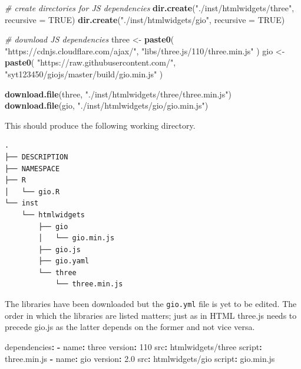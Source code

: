 \documentclass[
]{krantz}
\makeatletter
\newenvironment{Shaded}{\begin{snugshade}}{\end{snugshade}}
\newcommand{\AttributeTok}[1]{\textcolor[rgb]{0.61,0.61,0.61}{#1}}
\newcommand{\CommentTok}[1]{\textcolor[rgb]{0.37,0.37,0.37}{\textit{#1}}}
\newcommand{\DataTypeTok}[1]{\textcolor[rgb]{0.27,0.27,0.27}{#1}}
\newcommand{\DecValTok}[1]{\textcolor[rgb]{0.06,0.06,0.06}{#1}}
\newcommand{\FloatTok}[1]{\textcolor[rgb]{0.06,0.06,0.06}{#1}}
\newcommand{\FunctionTok}[1]{\textcolor[rgb]{0,0,0}{#1}}
\newcommand{\KeywordTok}[1]{\textcolor[rgb]{0.27,0.27,0.27}{\textbf{#1}}}
\newcommand{\NormalTok}[1]{#1}
\newcommand{\OtherTok}[1]{\textcolor[rgb]{0.37,0.37,0.37}{#1}}
\newcommand{\StringTok}[1]{\textcolor[rgb]{0.5,0.5,0.5}{#1}}
\newenvironment{kframe}{%
\medskip{}
\setlength{\fboxsep}{.8em}
 \def\at@end@of@kframe{}%
 \ifinner\ifhmode%
  \def\at@end@of@kframe{\end{minipage}}%
  \begin{minipage}{\columnwidth}%
 \fi\fi%
 \def\FrameCommand##1{\hskip\@totalleftmargin \hskip-\fboxsep
 \colorbox{shadecolor}{##1}\hskip-\fboxsep
     \hskip-\linewidth \hskip-\@totalleftmargin \hskip\columnwidth}%
 \MakeFramed {\advance\hsize-\width
   \@totalleftmargin\z@ \linewidth\hsize
   \@setminipage}}%
 {\par\unskip\endMakeFramed%
 \at@end@of@kframe}
\renewenvironment{Shaded}{\begin{kframe}}{\end{kframe}}
\makeatother
\begin{document}
\begin{Shaded}
\begin{Highlighting}[]
\CommentTok{\# create directories for JS dependencies}
\KeywordTok{dir.create}\NormalTok{(}\StringTok{"./inst/htmlwidgets/three"}\NormalTok{, }\DataTypeTok{recursive =} \OtherTok{TRUE}\NormalTok{)}
\KeywordTok{dir.create}\NormalTok{(}\StringTok{"./inst/htmlwidgets/gio"}\NormalTok{, }\DataTypeTok{recursive =} \OtherTok{TRUE}\NormalTok{)}

\CommentTok{\# download JS dependencies}
\NormalTok{three <{-}}\StringTok{ }\KeywordTok{paste0}\NormalTok{(}
  \StringTok{"https://cdnjs.cloudflare.com/ajax/"}\NormalTok{,}
  \StringTok{"libs/three.js/110/three.min.js"}
\NormalTok{)}
\NormalTok{gio <{-}}\StringTok{ }\KeywordTok{paste0}\NormalTok{(}
  \StringTok{"https://raw.githubusercontent.com/"}\NormalTok{,}
  \StringTok{"syt123450/giojs/master/build/gio.min.js"}
\NormalTok{)}

\KeywordTok{download.file}\NormalTok{(three, }\StringTok{"./inst/htmlwidgets/three/three.min.js"}\NormalTok{)}
\KeywordTok{download.file}\NormalTok{(gio, }\StringTok{"./inst/htmlwidgets/gio/gio.min.js"}\NormalTok{)}
\end{Highlighting}
\end{Shaded}

This should produce the following working directory.

\begin{verbatim}
.
├── DESCRIPTION
├── NAMESPACE
├── R
│   └── gio.R
└── inst
    └── htmlwidgets
        ├── gio
        │   └── gio.min.js
        ├── gio.js
        ├── gio.yaml
        └── three
            └── three.min.js
\end{verbatim}

The libraries have been downloaded but the \texttt{gio.yml} file is yet to be edited. The order in which the libraries are listed matters; just as in HTML three.js needs to precede gio.js as the latter depends on the former and not vice versa.

\begin{Shaded}
\begin{Highlighting}[]
\FunctionTok{dependencies}\KeywordTok{:}
\AttributeTok{  }\KeywordTok{{-}}\AttributeTok{ }\FunctionTok{name}\KeywordTok{:}\AttributeTok{ three}
\AttributeTok{    }\FunctionTok{version}\KeywordTok{:}\AttributeTok{ }\DecValTok{110}
\AttributeTok{    }\FunctionTok{src}\KeywordTok{:}\AttributeTok{ htmlwidgets/three}
\AttributeTok{    }\FunctionTok{script}\KeywordTok{:}\AttributeTok{ three.min.js}
\AttributeTok{  }\KeywordTok{{-}}\AttributeTok{ }\FunctionTok{name}\KeywordTok{:}\AttributeTok{ gio}
\AttributeTok{    }\FunctionTok{version}\KeywordTok{:}\AttributeTok{ }\FloatTok{2.0}
\AttributeTok{    }\FunctionTok{src}\KeywordTok{:}\AttributeTok{ htmlwidgets/gio}
\AttributeTok{    }\FunctionTok{script}\KeywordTok{:}\AttributeTok{ gio.min.js}
\end{Highlighting}
\end{Shaded}
\end{document}

